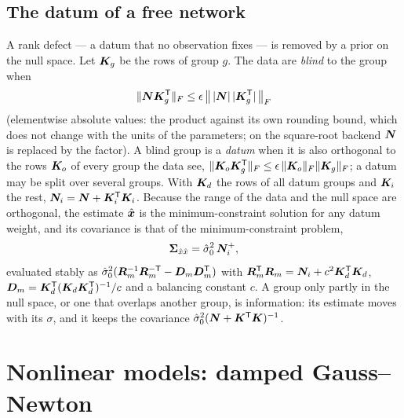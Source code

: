 \subsection{The datum of a free network}\label{sec:datum}
A rank defect --- a datum that no observation fixes --- is removed by a prior on the null space.
Let $\bm{K}_g$ be the rows of group $g$. The data are \emph{blind} to the group when
\[
\|\bm{N}\bm{K}_g^{\mathsf T}\|_F\le\epsilon\,\bigl\|\,|\bm{N}|\,|\bm{K}_g^{\mathsf T}|\,\bigr\|_F
\]
(elementwise absolute values: the product against its own rounding bound, which does not change
with the units of the parameters; on the square-root backend $\bm{N}$ is replaced by the factor).
A blind group is a \emph{datum} when it is also orthogonal to the rows $\bm{K}_o$ of every group
the data see, $\|\bm{K}_o\bm{K}_g^{\mathsf T}\|_F\le\epsilon\,\|\bm{K}_o\|_F\|\bm{K}_g\|_F$; a datum may be
split over several groups. With $\bm{K}_d$ the rows
of all datum groups and $\bm{K}_i$ the rest, $\bm{N}_i=\bm{N}+\bm{K}_i^{\mathsf T}\bm{K}_i$. Because the range
of the data and the null space are orthogonal, the estimate $\hat{\bm{x}}$ is the
minimum-constraint solution for any datum weight, and its covariance is that of the
minimum-constraint problem,
\begin{equation}\label{eq:mincon}
\bm{\Sigma}_{\hat x\hat x}=\hat\sigma_0^2\,\bm{N}_i^{+},
\end{equation}
evaluated stably as $\hat\sigma_0^2(\bm{R}_m^{-1}\bm{R}_m^{-\mathsf T}-\bm{D}_m\bm{D}_m^{\mathsf T})$ with
$\bm{R}_m^{\mathsf T}\bm{R}_m=\bm{N}_i+c^2\bm{K}_d^{\mathsf T}\bm{K}_d$, $\bm{D}_m=\bm{K}_d^{\mathsf T}(\bm{K}_d\bm{K}_d^{\mathsf T})^{-1}/c$ and a
balancing constant $c$. A group only partly in the null space, or one that overlaps another group,
is information: its estimate moves with its $\sigma$, and it keeps the covariance
$\hat\sigma_0^2(\bm{N}+\bm{K}^{\mathsf T}\bm{K})^{-1}$.

\section{Nonlinear models: damped Gauss--Newton}\label{sec:gn}

